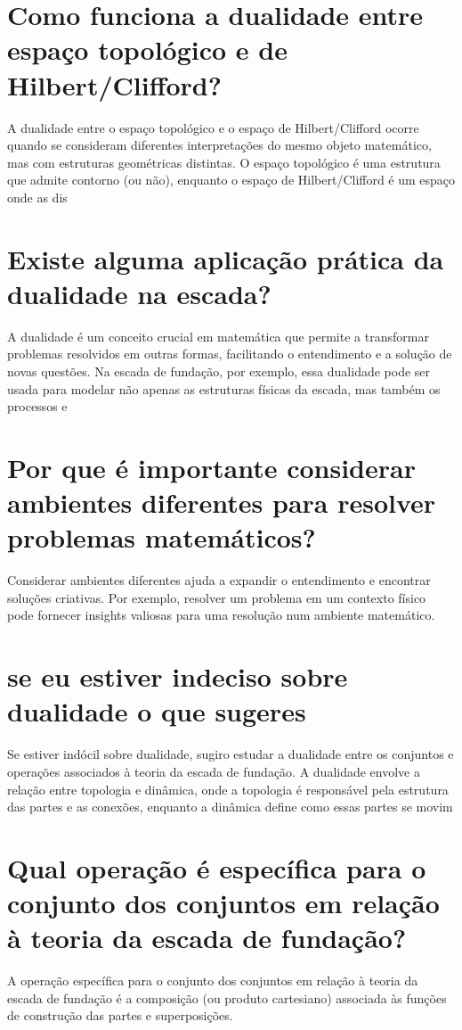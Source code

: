 \documentclass[11pt,a4paper]{article}
\begin{document}
\section{Como funciona a dualidade entre espaço topológico e de Hilbert/Clifford?}
A dualidade entre o espaço topológico e o espaço de Hilbert/Clifford ocorre quando se consideram diferentes interpretações do mesmo objeto matemático, mas com estruturas geométricas distintas. O espaço topológico é uma estrutura que admite contorno (ou não), enquanto o espaço de Hilbert/Clifford é um espaço onde as dis

\section{Existe alguma aplicação prática da dualidade na escada?}
A dualidade é um conceito crucial em matemática que permite a transformar problemas resolvidos em outras formas, facilitando o entendimento e a solução de novas questões. Na escada de fundação, por exemplo, essa dualidade pode ser usada para modelar não apenas as estruturas físicas da escada, mas também os processos e 

\section{Por que é importante considerar ambientes diferentes para resolver problemas matemáticos?}
Considerar ambientes diferentes ajuda a expandir o entendimento e encontrar soluções criativas. Por exemplo, resolver um problema em um contexto físico pode fornecer insights valiosas para uma resolução num ambiente matemático.

\section{se eu estiver indeciso sobre dualidade o que sugeres}
Se estiver indócil sobre dualidade, sugiro estudar a dualidade entre os conjuntos e operações associados à teoria da escada de fundação. A dualidade envolve a relação entre topologia e dinâmica, onde a topologia é responsável pela estrutura das partes e as conexões, enquanto a dinâmica define como essas partes se movim

\section{Qual operação é específica para o conjunto dos conjuntos em relação à teoria da escada de fundação?}
A operação específica para o conjunto dos conjuntos em relação à teoria da escada de fundação é a composição (ou produto cartesiano) associada às funções de construção das partes e superposições.
\end{document}
